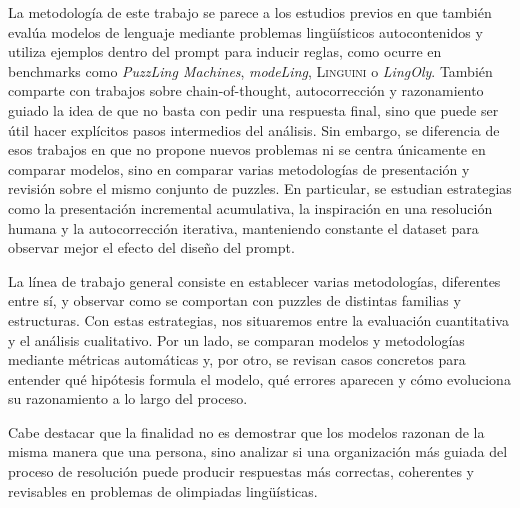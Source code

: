 La metodología de este trabajo se parece a los estudios previos en que también evalúa modelos de lenguaje mediante problemas lingüísticos autocontenidos y utiliza ejemplos dentro del prompt para inducir reglas, como ocurre en benchmarks como \textit{PuzzLing Machines}, \textit{modeLing}, \textsc{Linguini} o \textit{LingOly}. También comparte con trabajos sobre chain-of-thought, autocorrección y razonamiento guiado la idea de que no basta con pedir una respuesta final, sino que puede ser útil hacer explícitos pasos intermedios del análisis. Sin embargo, se diferencia de esos trabajos en que no propone nuevos problemas ni se centra únicamente en comparar modelos, sino en comparar varias metodologías de presentación y revisión sobre el mismo conjunto de puzzles. En particular, se estudian estrategias como la presentación incremental acumulativa, la inspiración en una resolución humana y la autocorrección iterativa, manteniendo constante el dataset para observar mejor el efecto del diseño del prompt.

La línea de trabajo general consiste en establecer varias metodologías, diferentes entre sí, y observar como se comportan con puzzles de distintas familias y estructuras. Con estas estrategias, nos situaremos entre la evaluación cuantitativa y el análisis cualitativo. Por un lado, se comparan modelos y metodologías mediante métricas automáticas y, por otro, se revisan casos concretos para entender qué hipótesis formula el modelo, qué errores aparecen y cómo evoluciona su razonamiento a lo largo del proceso.

Cabe destacar que la finalidad no es demostrar que los modelos razonan de la misma manera que una persona, sino analizar si una organización más guiada del proceso de resolución puede producir respuestas más correctas, coherentes y revisables en problemas de olimpiadas lingüísticas.
